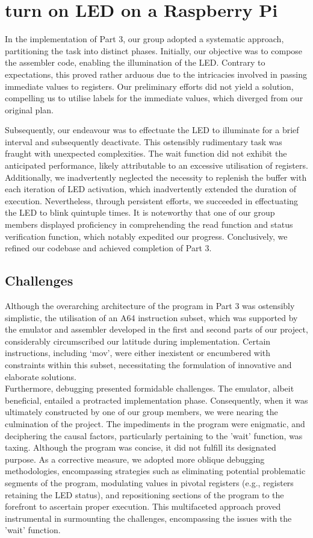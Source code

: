 \documentclass[11pt]{article}
\begin{document}
\section{turn on LED on a Raspberry Pi}
In the implementation of Part 3, our group adopted a systematic approach, partitioning the task into distinct phases. Initially, our objective was to compose the assembler code, enabling the illumination of the LED. Contrary to expectations, this proved rather arduous due to the intricacies involved in passing immediate values to registers. Our preliminary efforts did not yield a solution, compelling us to utilise labels for the immediate values, which diverged from our original plan.

Subsequently, our endeavour was to effectuate the LED to illuminate for a brief interval and subsequently deactivate. This ostensibly rudimentary task was fraught with unexpected complexities. The wait function did not exhibit the anticipated performance, likely attributable to an excessive utilisation of registers. Additionally, we inadvertently neglected the necessity to replenish the buffer with each iteration of LED activation, which inadvertently extended the duration of execution. Nevertheless, through persistent efforts, we succeeded in effectuating the LED to blink quintuple times. It is noteworthy that one of our group members displayed proficiency in comprehending the read function and status verification function, which notably expedited our progress. Conclusively, we refined our codebase and achieved completion of Part 3.

\subsection{Challenges}
Although the overarching architecture of the program in Part 3 was ostensibly simplistic, the utilisation of an A64 instruction subset, which was supported by the emulator and assembler developed in the first and second parts of our project, considerably circumscribed our latitude during implementation. Certain instructions, including ‘mov’, were either inexistent or encumbered with constraints within this subset, necessitating the formulation of innovative and elaborate solutions. \\

Furthermore, debugging presented formidable challenges. The emulator, albeit beneficial, entailed a protracted implementation phase. Consequently, when it was ultimately constructed by one of our group members, we were nearing the culmination of the project. The impediments in the program were enigmatic, and deciphering the causal factors, particularly pertaining to the 'wait' function, was taxing. Although the program was concise, it did not fulfill its designated purpose. As a corrective measure, we adopted more oblique debugging methodologies, encompassing strategies such as eliminating potential problematic segments of the program, modulating values in pivotal registers (e.g., registers retaining the LED status), and repositioning sections of the program to the forefront to ascertain proper execution. This multifaceted approach proved instrumental in surmounting the challenges, encompassing the issues with the 'wait' function.
\end{document}
